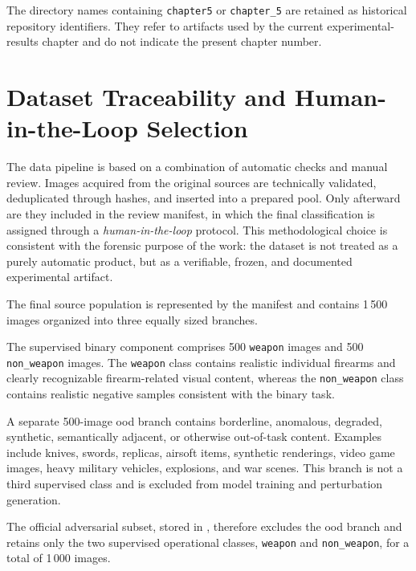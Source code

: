 The directory names containing \texttt{chapter5} or
\texttt{chapter\_5} are retained as historical repository identifiers. They
refer to artifacts used by the current experimental-results chapter and do not
indicate the present chapter number.


\section{Dataset Traceability and Human-in-the-Loop Selection}
\label{app:dataset-traceability-human-in-the-loop}

The data pipeline is based on a combination of automatic checks and manual
review. Images acquired from the original sources are technically validated,
deduplicated through hashes, and inserted into a prepared pool. Only afterward
are they included in the review manifest, in which the final classification is
assigned through a \textit{human-in-the-loop} protocol. This methodological
choice is consistent with the forensic purpose of the work: the dataset is not
treated as a purely automatic product, but as a verifiable, frozen, and
documented experimental artifact.


The final source population is represented by the
 manifest and contains 1\,500 images
organized into three equally sized branches.

The supervised binary component comprises 500 \texttt{weapon} images and
500 \texttt{non\_weapon} images. The \texttt{weapon} class contains realistic
individual firearms and clearly recognizable firearm-related visual content,
whereas the \texttt{non\_weapon} class contains realistic negative samples
consistent with the binary task.

A separate 500-image \gls{ood} branch contains borderline, anomalous, degraded,
synthetic, semantically adjacent, or otherwise out-of-task content. Examples
include knives, swords, replicas, airsoft items, synthetic renderings, video
game images, heavy military vehicles, explosions, and war scenes. This branch
is not a third supervised class and is excluded from model training and
perturbation generation.

The official adversarial subset, stored in
, therefore excludes the
\gls{ood} branch and retains only the two supervised operational classes,
\texttt{weapon} and \texttt{non\_weapon}, for a total of 1\,000 images.

